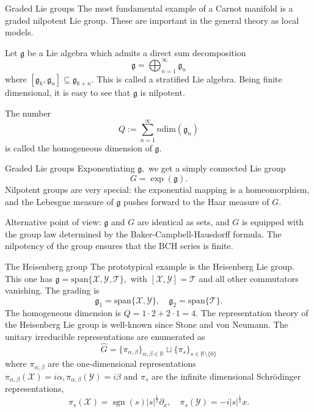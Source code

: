 \documentclass{beamer}
\numberwithin{equation}{section}
\theoremstyle{plain}
\theoremstyle{plain}
\theoremstyle{definition}
\theoremstyle{plain}
\theoremstyle{plain}
\theoremstyle{definition}
\newcommand{\Rl}{\mathbb{R}}
\newcommand{\Tc}{\mathcal{T}}
\newcommand{\Xc}{\mathcal{X}}
\newcommand{\Yc}{\mathcal{Y}}
\newcommand{\sgn}{\operatorname{sgn}}
\newcommand{\gf}{\mathfrak{g}}
\begin{document}
\begin{frame}{Graded Lie groups}
  The most fundamental example of a Carnot manifold is a graded nilpotent Lie group. These are important in the general theory as local models.

  Let $\gf$ be a Lie algebra which admits a direct sum decomposition
  \[
    \gf = \bigoplus_{n=1}^\infty \gf_n
  \]
  where $[\gf_k,\gf_n] \subseteq \gf_{k+n}.$ This is called a stratified Lie algebra. Being finite dimensional, it is easy to see that $\gf$ is nilpotent.

  The number
  \[
    Q := \sum_{n=1}^\infty n\mathrm{dim}(\gf_n)
  \]
  is called the homogeneous dimension of $\gf.$
\end{frame}

\begin{frame}{Graded Lie groups}
  Exponentiating $\gf,$ we get a simply connected Lie group
  \[
    G = \exp(\gf).
  \]
  Nilpotent groups are very special: the exponential mapping is a homeomorphism, and the Lebesgue measure of $\gf$ pushes forward to the Haar measure of $G.$

  Alternative point of view: $\gf$ and $G$ are identical as sets, and $G$ is equipped with the group law determined by the Baker-Campbell-Hausdorff formula. The nilpotency of the group ensures that the BCH series is finite.
\end{frame}


\begin{frame}{The Heisenberg group}
  The prototypical example is the Heisenberg Lie group. This one has $\gf = \mathrm{span}\{\Xc,\Yc,\Tc\},$ with $[\Xc,\Yc] = \Tc$ and all other commutators vanishing. The grading is
  \[
    \gf_1 = \mathrm{span}\{\Xc,\Yc\},\quad \gf_2 = \mathrm{span}\{\Tc\}.
  \]
  The homogeneous dimension is $Q=1\cdot 2 + 2\cdot 1 = 4.$
  The representation theory of the Heisenberg Lie group is well-known since Stone and von Neumann. The unitary irreducible representations are enumerated as
  \[
    \widehat{G} = \{\pi_{\alpha,\beta}\}_{\alpha,\beta\in \Rl}\sqcup \{\pi_s\}_{s \in \Rl\setminus \{0\}}
  \]
  where $\pi_{\alpha,\beta}$ are the one-dimensional representations $\pi_{\alpha,\beta}(\Xc) = i\alpha,\pi_{\alpha,\beta}(\Yc) = i\beta$ and $\pi_{s}$
  are the infinite dimensional Schr\"{o}dinger representations,
  \[
    \pi_s(\Xc) = \sgn(s)|s|^{\frac12}\partial_x,\quad \pi_s(\Yc) = -i|s|^{\frac12}x.
  \]
\end{frame}
\end{document}

